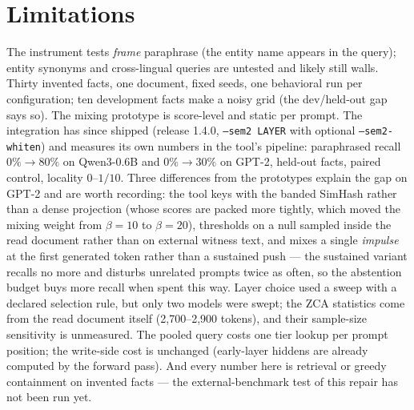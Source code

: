 \documentclass[11pt]{article}
\begin{document}
\section{Limitations}

The instrument tests \emph{frame} paraphrase (the entity name appears in the query); entity synonyms and cross-lingual queries are untested and likely still walls. Thirty invented facts, one document, fixed seeds, one behavioral run per configuration; ten development facts make a noisy grid (the dev/held-out gap says so). The mixing prototype is score-level and static per prompt. The integration has since shipped (release 1.4.0, \texttt{--sem2 LAYER} with optional \texttt{--sem2-whiten}) and measures its own numbers in the tool's pipeline: paraphrased recall $0\% \to 80\%$ on Qwen3-0.6B and $0\% \to 30\%$ on GPT-2, held-out facts, paired control, locality $0$--$1/10$. Three differences from the prototypes explain the gap on GPT-2 and are worth recording: the tool keys with the banded SimHash rather than a dense projection (whose scores are packed more tightly, which moved the mixing weight from $\beta{=}10$ to $\beta{=}20$), thresholds on a null sampled inside the read document rather than on external witness text, and mixes a single \emph{impulse} at the first generated token rather than a sustained push --- the sustained variant recalls no more and disturbs unrelated prompts twice as often, so the abstention budget buys more recall when spent this way. Layer choice used a sweep with a declared selection rule, but only two models were swept; the ZCA statistics come from the read document itself (2{,}700--2{,}900 tokens), and their sample-size sensitivity is unmeasured. The pooled query costs one tier lookup per prompt position; the write-side cost is unchanged (early-layer hiddens are already computed by the forward pass). And every number here is retrieval or greedy containment on invented facts --- the external-benchmark test of this repair \cite{bench} has not been run yet.
\end{document}

